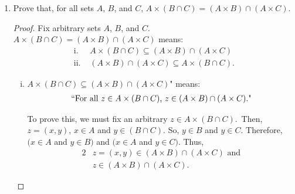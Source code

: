 \documentclass{article}
\begin{document}
\begin{enumerate}
\begin{proof}
                Therefore, since 
                \begin{alignat*}{2}
                    &A \times (B \cup C) \subseteq (A \times B) \cup (A \times C)\text{ and} \\
                    &(A \times B) \cup (A \times C) \subseteq A \times (B \cup C)\text{, then} \\
                    &A \times (B \cup C) = (A \times B) \cup (A \times C)\text{.}
                \end{alignat*}
            \end{proof}
 
        \item Prove that, for all sets $A$, $B$, and $C$, $A \times (B \cap C) = (A \times B) \cap (A \times C)$.
            \begin{proof}
                Fix arbitrary sets $A$, $B$, and $C$. $A \times (B \cap C) = (A \times B) \cap (A \times C)$ means:
                \begin{align*}
                        \text{i. } &A \times (B \cap C) \subseteq (A \times B) \cap (A \times C) \\
                        \text{ii. } &(A \times B) \cap (A \times C) \subseteq A \times (B \cap C).
                    \end{align*}

                \begin{enumerate}[i.]
                    \item \lQuote $A \times (B \cap C) \subseteq (A \times B) \cap (A \times C)$" means:
                        \begin{align*}
                            `` \text{For all } z \in A \times (B \cap C)\text{, } z \in (A \times B) \cap (A \times C)\text{."}
                        \end{align*}

                        To prove this, we must fix an arbitrary $z \in A \times (B \cap C)$.\ Then, $z = (x, y)$, $x \in A$ and $y \in (B \cap C)$. So, $y \in B$ and $y \in C$. Therefore, $(x \in A$ and $y \in B)$ and $(x \in A$ and $y \in C)$. Thus,
                        \begin{alignat*}{2}
                            &z = (x,y) \in (A \times B) \cap (A \times C) \text{ and} \\
                            &z \in (A \times B) \cap (A \times C)\text{.}
                        \end{alignat*}


\end{enumerate}
\end{proof}
\end{enumerate}
\end{document}

